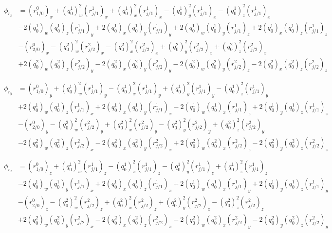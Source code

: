 \documentclass{article}
\begin{document}
\begin{align}
    \begin{split}
        \phi_{r_x} &= (r_{1/0}^0)_x + (q_0^1)_w^2(r_{j/1}^1)_x + (q_0^1)_x^2(r_{j/1}^1)_x - (q_0^1)_y^2(r_{j/1}^1)_x - (q_0^1)_z^2(r_{j/1}^1)_x \\
                   &- 2(q_0^1)_w(q_0^1)_z(r_{j/1}^1)_y + 2(q_0^1)_x(q_0^1)_y(r_{j/1}^1)_y + 2(q_0^1)_w(q_0^1)_y(r_{j/1}^1)_z + 2(q_0^1)_x(q_0^1)_z(r_{j/1}^1)_z \\
                   &- (r_{2/0}^0)_x - (q_0^2)_w^2(r_{j/2}^2)_x - (q_0^2)_x^2(r_{j/2}^2)_x + (q_0^2)_y^2(r_{j/2}^2)_x + (q_0^2)_z^2(r_{j/2}^2)_x \\
                   &+ 2(q_0^2)_w(q_0^2)_z(r_{j/2}^2)_y - 2(q_0^2)_x(q_0^2)_y(r_{j/2}^2)_y - 2(q_0^2)_w(q_0^2)_y(r_{j/2}^2)_z - 2(q_0^2)_x(q_0^2)_z(r_{j/2}^2)_z
    \end{split} \\
    \nonumber \\
    \begin{split}
        \phi_{r_y} &= (r_{1/0}^0)_y + (q_0^1)_w^2(r_{j/1}^1)_y - (q_0^1)_x^2(r_{j/1}^1)_y + (q_0^1)_y^2(r_{j/1}^1)_y - (q_0^1)_z^2(r_{j/1}^1)_y \\
                   &+ 2(q_0^1)_w(q_0^1)_z(r_{j/1}^1)_x + 2(q_0^1)_x(q_0^1)_y(r_{j/1}^1)_x - 2(q_0^1)_w(q_0^1)_x(r_{j/1}^1)_z + 2(q_0^1)_y(q_0^1)_z(r_{j/1}^1)_z \\
                   &- (r_{2/0}^0)_y - (q_0^2)_w^2(r_{j/2}^2)_y + (q_0^2)_x^2(r_{j/2}^2)_y - (q_0^2)_y^2(r_{j/2}^2)_y + (q_0^2)_z^2(r_{j/2}^2)_y \\
                   &- 2(q_0^2)_w(q_0^2)_z(r_{j/2}^2)_x - 2(q_0^2)_x(q_0^2)_y(r_{j/2}^2)_x + 2(q_0^2)_w(q_0^2)_x(r_{j/2}^2)_z - 2(q_0^2)_y(q_0^2)_z(r_{j/2}^2)_z
    \end{split} \\
    \nonumber \\
    \begin{split}
        \phi_{r_z} &= (r_{1/0}^0)_z + (q_0^1)_w^2(r_{j/1}^1)_z - (q_0^1)_x^2(r_{j/1}^1)_z - (q_0^1)_y^2(r_{j/1}^1)_z + (q_0^1)_z^2(r_{j/1}^1)_z \\
                   &- 2(q_0^1)_w(q_0^1)_y(r_{j/1}^1)_x + 2(q_0^1)_x(q_0^1)_z(r_{j/1}^1)_x + 2(q_0^1)_w(q_0^1)_x(r_{j/1}^1)_y + 2(q_0^1)_y(q_0^1)_z(r_{j/1}^1)_y \\
                   &- (r_{2/0}^0)_z - (q_0^2)_w^2(r_{j/2}^2)_z + (q_0^2)_x^2(r_{j/2}^2)_z + (q_0^2)_y^2(r_{j/2}^2)_z - (q_0^2)_z^2(r_{j/2}^2)_z \\
                   &+ 2(q_0^2)_w(q_0^2)_y(r_{j/2}^2)_x - 2(q_0^2)_x(q_0^2)_z(r_{j/2}^2)_x - 2(q_0^2)_w(q_0^2)_x(r_{j/2}^2)_y - 2(q_0^2)_y(q_0^2)_z(r_{j/2}^2)_y
    \end{split}
\end{align}
\end{document}
